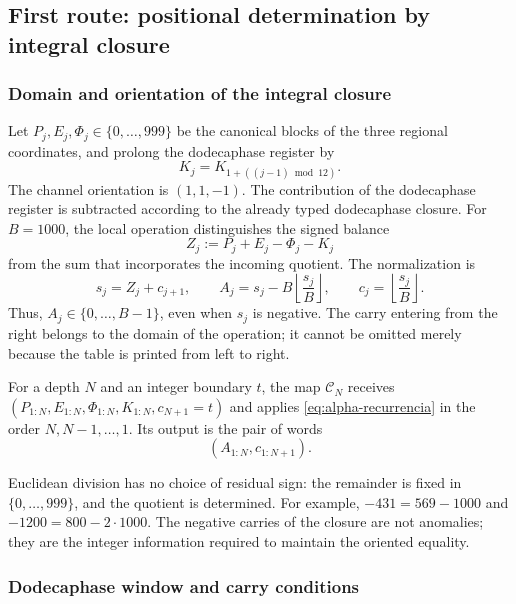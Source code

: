 \subsection{First route: positional determination by integral closure}
\subsubsection{Domain and orientation of the integral closure}
\label{subsec:alpha-dominio}

Let \(P_j,E_j,\Phi_j\in\{0,\ldots,999\}\) be the canonical blocks of the
three regional coordinates, and prolong the dodecaphase register by
\[
 K_j=K_{1+((j-1)\bmod12)}.
\]
The channel orientation is \((1,1,-1)\). The contribution of the
dodecaphase register is subtracted according to the already typed dodecaphase
closure. For \(B=1000\), the local operation distinguishes the signed balance
\[
 Z_j:=P_j+E_j-\Phi_j-K_j
\]
from the sum that incorporates the incoming quotient. The normalization is
\begin{equation}
 s_j=Z_j+c_{j+1},\qquad
 A_j=s_j-B\left\lfloor\frac{s_j}{B}\right\rfloor,
 \qquad c_j=\left\lfloor\frac{s_j}{B}\right\rfloor.
 \label{eq:alpha-recurrencia}
\end{equation}
Thus, \(A_j\in\{0,\ldots,B-1\}\), even when \(s_j\) is negative. The carry
entering from the right belongs to the domain of the operation; it cannot be
omitted merely because the table is printed from left to right.

\begin{definition}
\label{def:alpha-finita}
For a depth \(N\) and an integer boundary \(t\), the map \(\mathcal C_N\)
receives \((P_{1:N},E_{1:N},\Phi_{1:N},K_{1:N},c_{N+1}=t)\) and applies
\eqref{eq:alpha-recurrencia} in the order \(N,N-1,\ldots,1\). Its output is
the pair of words
\[
 (A_{1:N},c_{1:N+1}).
\]
\end{definition}

Euclidean division has no choice of residual sign: the remainder is fixed in
\(\{0,\ldots,999\}\), and the quotient is determined. For example,
\(-431=569-1000\) and \(-1200=800-2\cdot1000\). The negative carries of the
closure are not anomalies; they are the integer information required to
maintain the oriented equality.

\subsubsection{Dodecaphase window and carry conditions}
\label{subsec:alpha-ventana}

